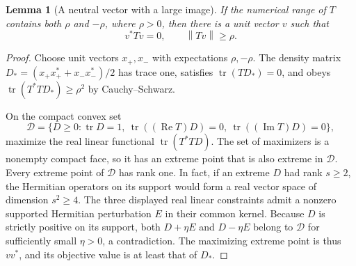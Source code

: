 \documentclass[11pt]{article}
\newtheorem{lemma}[theorem]{Lemma}
\theoremstyle{remark}
\newcommand{\tr}{\operatorname{tr}}
\newcommand{\Rea}{\operatorname{Re}}
\newcommand{\Ima}{\operatorname{Im}}
\newcommand{\norm}[1]{\left\lVert#1\right\rVert}
\numberwithin{equation}{section}
\begin{document}
\begin{lemma}[A neutral vector with a large image]\label{lem:neutral}
If the numerical range of $T$ contains both $\rho$ and $-\rho$, where $\rho>0$,
then there is a unit vector $v$ such that
\begin{equation}\label{eq:neutral}
 v^*Tv=0,\qquad \norm{Tv}\ge\rho.
\end{equation}
\end{lemma}
\begin{proof}
Choose unit vectors $x_+,x_-$ with expectations $\rho,-\rho$. The density matrix
$D_*=(x_+x_+^*+x_-x_-^*)/2$ has trace one, satisfies $\tr(TD_*)=0$, and obeys
$\tr(T^*TD_*)\ge\rho^2$ by Cauchy--Schwarz.

On the compact convex set
\[
 \mathcal D=\{D\ge0:\tr D=1,\ \tr((\Rea T)D)=0,
                  \ \tr((\Ima T)D)=0\},
\]
maximize the real linear functional $\tr(T^*TD)$. The set of maximizers is a
nonempty compact face, so it has an extreme point that is also extreme in
$\mathcal D$. Every extreme point of $\mathcal D$ has rank one. In fact, if an
extreme $D$ had rank $s\ge2$, the Hermitian operators on its support would form
a real vector space of dimension $s^2\ge4$. The three displayed real linear
constraints admit a nonzero supported Hermitian perturbation $E$ in their
common kernel. Because $D$ is strictly positive on its support, both
$D+\eta E$ and $D-\eta E$ belong to $\mathcal D$ for sufficiently small
$\eta>0$, a contradiction. The maximizing extreme point is thus $vv^*$, and
its objective value is at least that of $D_*$.
\end{proof}
\end{document}
